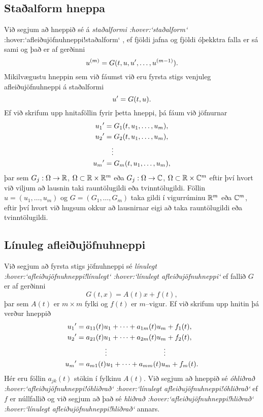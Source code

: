 \subsection*{Staðalform hneppa}

Við segjum að hneppið sé á {\it
staðalformi :hover:`staðalform`} :hover:`afleiðujöfnuhneppi!staðalform`
, ef fjöldi jafna og fjöldi
óþekktra falla er sá sami og það er af gerðinni
$$
u^{(m)}=G(t,u,u{\sp{\prime}},\dots,u^{(m-1)}).
$$
Mikilvægustu hneppin sem við fáumst við eru
fyrsta stigs venjuleg afleiðujöfnuhneppi á staðalformi
$$
u{\sp{\prime}} =G(t,u).
$$
Ef við skrifum upp hnitaföllin fyrir þetta hneppi, þá  fáum við jöfnurnar
\begin{align*}
u_1{\sp{\prime}}&= G_1(t, u_1,\dots, u_m),\\
u_2{\sp{\prime}}&= G_2(t, u_1,\dots, u_m),\\
&\quad \vdots\\
u_m{\sp{\prime}}&= G_m(t, u_1,\dots, u_m),
\end{align*}
þar sem $G_j:\Omega\to{\mathbb R}$,  $\Omega\subset {\mathbb R}\times{\mathbb R}^m$ eða
$G_j:\Omega\to{\mathbb C}$,  $\Omega\subset {\mathbb R}\times{\mathbb C}^m$ eftir því hvort við
viljum að lausnin taki rauntölugildi eða tvinntölugildi.
Föllin $u=(u_1,\dots,u_m)$ og $G=(G_1,\dots,G_m)$
taka gildi í vigurrúminu ${\mathbb R}\sp m$ eða ${\mathbb C}\sp m$, eftir því hvort við
hugsum okkur að lausnirnar eigi að taka rauntölugildi eða
tvinntölugildi.


\subsection*{Línuleg afleiðujöfnuhneppi}

Við segjum að fyrsta stigs jöfnuhneppi sé {\it
línulegt :hover:`afleiðujöfnuhneppi!línulegt` :hover:`línulegt
afleiðujöfnuhneppi`} ef fallið
$G$ er af gerðinni 
 $$G(t,x)=A(t)x+f(t),
 $$
þar sem $A(t)$ er $m\times m$ fylki og $f(t)$ er $m$--vigur.
Ef við skrifum upp hnitin þá verður hneppið
\begin{align*}
u_1{\sp{\prime}}&=a_{11}(t)u_1+\cdots+a_{1m}(t)u_m+f_1(t),\\
u_2{\sp{\prime}}&=a_{21}(t)u_1+\cdots+a_{2m}(t)u_m+f_2(t),\\
&\qquad \qquad \vdots\qquad \qquad \qquad \qquad \vdots\\
u_m{\sp{\prime}}&=a_{m1}(t)u_1+\cdots+a_{mm}(t)u_m+f_m(t).
\end{align*}
Hér eru föllin $a_{jk}(t)$ stökin í fylkinu $A(t)$.
Við segjum að hneppið sé {\it
óhliðrað :hover:`afleiðujöfnuhneppi!óhliðrað` :hover:`línulegt
afleiðujöfnuhneppi!óhliðrað`}
ef $f$ er núllfallið og við segjum  að það sé {\it
hliðrað :hover:`afleiðujöfnuhneppi!hliðrað` :hover:`línulegt
afleiðujöfnuhneppi!hliðrað`}  annars.


